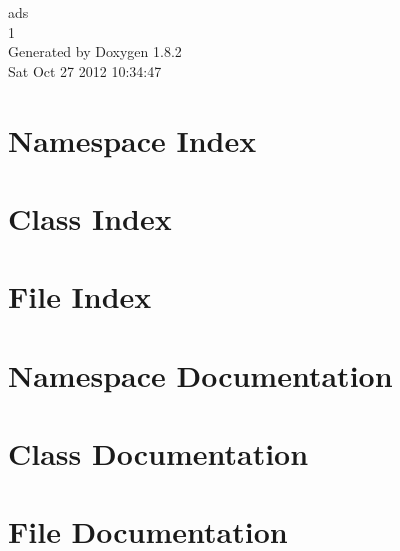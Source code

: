\documentclass{book}
\begin{document}
\hypersetup{pageanchor=false,citecolor=blue}
\begin{titlepage}
\vspace*{7cm}
\begin{center}
{\Large ads \\[1ex]\large 1 }\\
\vspace*{1cm}
{\large Generated by Doxygen 1.8.2}\\
\vspace*{0.5cm}
{\small Sat Oct 27 2012 10:34:47}\\
\end{center}
\end{titlepage}
\clearemptydoublepage
{}
\tableofcontents
\clearemptydoublepage
{}
\hypersetup{pageanchor=true,citecolor=blue}
\chapter{Namespace Index}

\chapter{Class Index}

\chapter{File Index}

\chapter{Namespace Documentation}






\chapter{Class Documentation}
















\chapter{File Documentation}







\printindex
\end{document}
